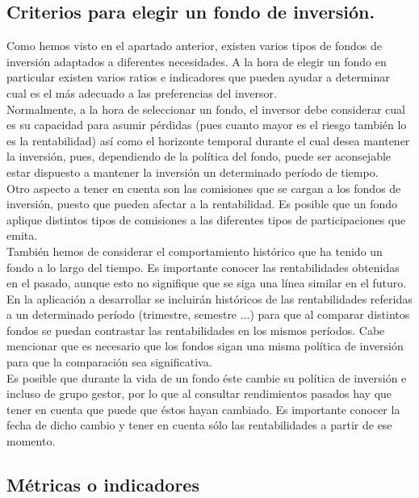 \documentclass[12pt, a4paper]{book}
\begin{document}
\subsection{Criterios para elegir un fondo de inversión.}


Como hemos visto en el apartado anterior, existen varios tipos de fondos de inversión adaptados a diferentes necesidades. A la hora de elegir un fondo en particular existen varios ratios e indicadores que pueden ayudar a determinar cual es el más adecuado a las preferencias del inversor.\\

Normalmente, a la hora de seleccionar un fondo, el inversor debe considerar cual es su capacidad para asumir pérdidas (pues cuanto mayor es el riesgo también lo es la rentabilidad) así como el horizonte temporal durante el cual desea mantener la inversión, pues, dependiendo de la política del fondo, puede ser aconsejable estar dispuesto a mantener la inversión un determinado período de tiempo.\\

Otro aspecto a tener en cuenta son las comisiones que se cargan a los fondos de inversión, puesto que pueden afectar a la rentabilidad. Es posible que un fondo aplique distintos tipos de comisiones a las diferentes tipos de participaciones que emita.\\

También hemos de considerar el comportamiento histórico que ha tenido un fondo a lo largo del tiempo. Es importante conocer las rentabilidades obtenidas en el pasado, aunque esto no signifique que se siga una línea similar en el futuro. En la aplicación a desarrollar se incluirán históricos de las rentabilidades referidas a un determinado período (trimestre, semestre ...) para que al comparar distintos fondos se puedan contrastar las rentabilidades en los mismos períodos. Cabe mencionar que es necesario que los fondos sigan una misma política de inversión para que la comparación sea significativa.\\

Es posible que durante la vida de un fondo éste cambie su política de inversión e incluso de grupo gestor, por lo que al consultar rendimientos pasados hay que tener en cuenta que puede que éstos hayan cambiado. Es importante conocer la fecha de dicho cambio y tener en cuenta sólo las rentabilidades a partir de ese momento.\\

\newpage

 \subsection{Métricas o indicadores}
\end{document}
